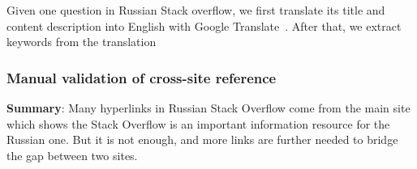 Given one question in Russian Stack overflow, we first translate its title and content description into English with Google Translate~\cite{??}.
After that, we extract keywords from the translation

\subsubsection{Manual validation of cross-site reference\\}

\textbf{Summary}: 
Many hyperlinks in Russian Stack Overflow come from the main site which shows the Stack Overflow is an important information resource for the Russian one.
But it is not enough, and more links are further needed to bridge the gap between two sites.

